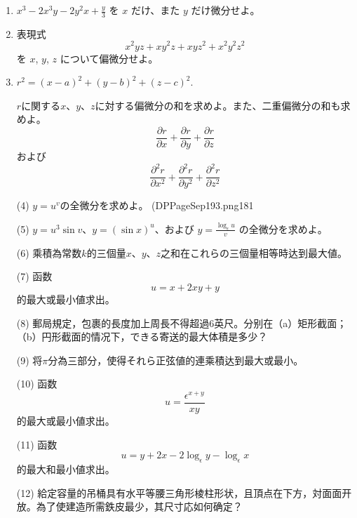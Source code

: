 \documentclass[a4paper,11pt,openany]{ltjsbook}
\begin{document}
\begin{enumerate}
\item[(1)] \( x^3 - 2x^3y - 2y^2x + \frac{y}{3} \) を \( x \) だけ、また \( y \) だけ微分せよ。

\item[(2)] 表現式
\[
x^2yz + xy^2z + xyz^2 + x^2y^2z^2
\]
を \( x \), \( y \), \( z \) について偏微分せよ。

\item[(3)] \( r^2 = (x-a)^2 + (y-b)^2 + (z-c)^2 \).

$r$に関する$x$、$y$、$z$に対する偏微分の和を求めよ。また、二重偏微分の和も求めよ。
$$\frac{\partial r}{\partial x} + \frac{\partial r}{\partial y} + \frac{\partial r}{\partial z}$$
および
$$\frac{\partial^2r}{\partial x^2} + \frac{\partial^2r}{\partial y^2} + \frac{\partial^2r}{\partial z^2}$$

(4) $y = u^v$の全微分を求めよ。
(DPPageSep{193.png}{181}%

(5) $y = u^3 \sin v$、$y = (\sin x)^u$、および $y = \frac{\log_\epsilon u}{v}$ の全微分を求めよ。

(6) 乘積為常数$k$的三個量$x$、$y$、$z$之和在これらの三個量相等時达到最大値。

(7) 函数
$$u = x + 2xy + y$$
的最大或最小値求出。

(8) 郵局規定，包裹的長度加上周長不得超過6英尺。分别在（a）矩形截面；（b）円形截面的情况下，できる寄送的最大体積是多少？

(9) 将$\pi$分為三部分，使得それら正弦値的連乘積达到最大或最小。

(10) 函数
$$u = \frac{\epsilon^{x+y}}{xy}$$
的最大或最小値求出。

(11) 函数
$$u = y + 2x - 2 \log_\epsilon y - \log_\epsilon x$$
的最大和最小値求出。

(12) 給定容量的吊桶具有水平等腰三角形棱柱形状，且頂点在下方，対面面开放。為了使建造所需鉄皮最少，其尺寸応如何确定？
\end{enumerate}
\end{document}
